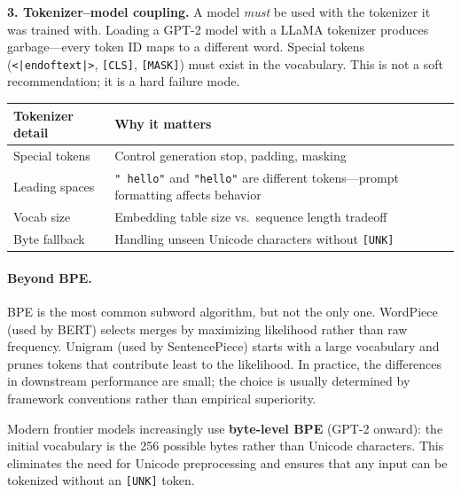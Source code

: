 \textbf{3. Tokenizer--model coupling.} A model \emph{must} be used with the tokenizer it was trained with. Loading a GPT-2 model with a LLaMA tokenizer produces garbage---every token ID maps to a different word. Special tokens (\texttt{<|endoftext|>}, \texttt{[CLS]}, \texttt{[MASK]}) must exist in the vocabulary. This is not a soft recommendation; it is a hard failure mode.

\begin{center}
\begin{tabularx}{\textwidth}{@{}l X@{}}
\toprule
\textbf{Tokenizer detail} & \textbf{Why it matters} \\
\midrule
Special tokens & Control generation stop, padding, masking \\
Leading spaces & \texttt{" hello"} and \texttt{"hello"} are different tokens---prompt formatting affects behavior \\
Vocab size & Embedding table size vs.\ sequence length tradeoff \\
Byte fallback & Handling unseen Unicode characters without \texttt{[UNK]} \\
\bottomrule
\end{tabularx}
\end{center}

\paragraph{Beyond BPE.} BPE is the most common subword algorithm, but not the only one. WordPiece (used by BERT) selects merges by maximizing likelihood rather than raw frequency. Unigram (used by SentencePiece) starts with a large vocabulary and prunes tokens that contribute least to the likelihood. In practice, the differences in downstream performance are small; the choice is usually determined by framework conventions rather than empirical superiority.

Modern frontier models increasingly use \textbf{byte-level BPE} (GPT-2 onward): the initial vocabulary is the 256 possible bytes rather than Unicode characters. This eliminates the need for Unicode preprocessing and ensures that any input can be tokenized without an \texttt{[UNK]} token.


